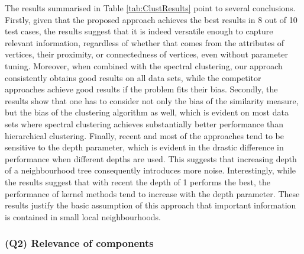 The results summarised in Table \ref{tab:ClustResults} point to several conclusions.
Firstly, given that the proposed approach achieves the best results in 8 out of 10 test cases, the results suggest that it is indeed versatile enough to capture relevant information, regardless of whether  that comes from the attributes of vertices, their proximity, or connectedness  of vertices, even without parameter tuning.
Moreover, when combined with the spectral clustering, our approach consistently obtains good results on all data sets, while the competitor approaches achieve good results if the problem fits their bias.
Secondly, the results show that one has to consider not only the bias of the similarity measure, but the bias of the clustering algorithm as well, which is evident on most data sets where spectral clustering achieves substantially better performance than hierarchical clustering.
Finally, \gls{recent} and most of the approaches tend to be sensitive to the depth parameter, which is evident in the drastic difference in performance when different depths are used.
This suggests that increasing depth of a neighbourhood tree consequently introduces more noise.
Interestingly, while the results suggest that with \gls{recent} the depth of 1 performs the best, the performance of kernel methods tend to increase with the depth parameter.
These results justify the basic assumption of this approach that important information is contained in small local neighbourhoods.











\subsubsection{\textbf{(Q2) Relevance of components}}

